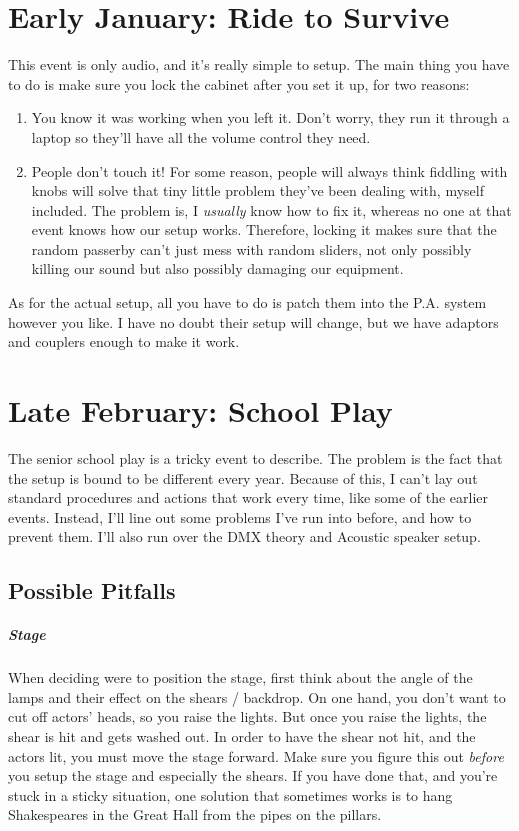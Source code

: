 \documentclass[letterpaper,10pt,oneside,headsepline]{scrreprt}
\begin{document}
\section{Early January: Ride to Survive}
This event is only audio, and it's really simple to setup. The main thing you have to do is make sure you lock the cabinet after you set it up, for two reasons:
\begin{enumerate}
\item You know it was working when you left it. Don't worry, they run it through a laptop so they'll have all the volume control they need.
\item People don't touch it! For some reason, people will always think fiddling with knobs will solve that tiny little problem they've been dealing with, myself included. The problem is, I \textit{usually} know how to fix it, whereas no one at that event knows how our setup works. Therefore, locking it makes sure that the random passerby can't just mess with random sliders, not only possibly killing our sound but also possibly damaging our equipment. 
\end{enumerate}

As for the actual setup, all you have to do is patch them into the P.A. system however you like. I have no doubt their setup will change, but we have adaptors and couplers enough to make it work.

\section{Late February: School Play}
The senior school play is a tricky event to describe. The problem is the fact that the setup is bound to be different every year. Because of this, I can't lay out standard procedures and actions that work every time, like some of the earlier events. Instead, I'll line out some problems I've run into before, and how to prevent them. I'll also run over the DMX theory and Acoustic speaker setup.  

\subsection{Possible Pitfalls}

\subparagraph{Stage} When deciding were to position the stage, first think about the angle of the lamps and their effect on the shears / backdrop. On one hand, you don't want to cut off actors' heads, so you raise the lights. But once you raise the lights, the shear is hit and gets washed out. In order to have the shear not hit, and the actors lit, you must move the stage forward. Make sure you figure this out \textit{before} you setup the stage and especially the shears. If you have done that, and you're stuck in a sticky situation, one solution that sometimes works is to hang Shakespeares in the Great Hall from the pipes on the pillars. 
\end{document}
